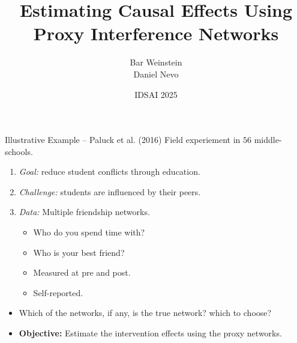\documentclass{beamer}
\title{Estimating Causal Effects Using \texorpdfstring{\\}{,} Proxy Interference Networks}
\author{Bar Weinstein \texorpdfstring{\\}{,} Daniel Nevo}
\institute{Statistics \& OR \\ Tel Aviv University}
\date{IDSAI 2025}
\begin{document}
    \begin{frame}
        \maketitle
    \end{frame}

        
    \begin{frame}{Illustrative Example -- Paluck et al. (2016)}
        \large
            Field experiement in $56$ middle-schools.
            \pause
            \begin{enumerate}
                \item \emph{Goal:} reduce student conflicts through education.
                \vspace{0.05cm}
                \pause
                \item \emph{Challenge:} students are influenced by their peers.
                \vspace{0.05cm}
                \pause
                \item \emph{Data:} Multiple friendship networks.
                \begin{itemize}
                    \item Who do you spend time with?
                    \item Who is your best friend?
                    \item Measured at pre and post.
                    \item Self-reported.
                \end{itemize}
            \end{enumerate}
            \vspace{0.2cm}
            \pause
            \begin{itemize}
            \item Which of the networks, if any, is the true network? which to choose?
            \vspace{0.2cm}
            \pause
            \item \textbf{Objective:} Estimate the intervention effects using the proxy networks.
        \end{itemize}
    \end{frame}
    
\end{document}
